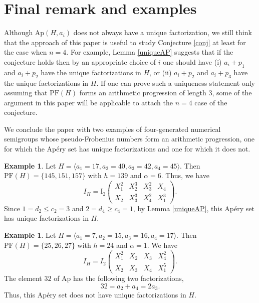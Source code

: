 \documentclass[12pt]{amsart}
\numberwithin{equation}{section}
\theoremstyle{definition}
\newtheorem{example}[theorem]{Example}
\newcommand{\PF}{\mathrm{PF}}
\newcommand{\Ap}{\mathrm{Ap}}
\begin{document}
\section*{Final remark and examples}
Although $\Ap(H,a_i)$ does not always have a unique factorization,
we still think that the approach of this paper is useful to study Conjecture \ref{conj} at least for the case when $n=4$.
For example, Lemma \ref{uniqueAP} suggests that if the conjecture holds then by an appropriate choice of $i$ one should have (i) $a_i+p_1$ and $a_i+p_2$ have the unique factorizations in $H$,
or (ii) $a_i+p_2$ and $a_i+p_3$ have the unique factorizations in $H$. If one can prove such a uniqueness statement only assuming that $\PF(H)$ forms an arithmetic progression of length $3$,
some of the argument in this paper will be applicable to attach the $n=4$ case of the conjecture.

We conclude the paper with two examples of four-generated numerical semigroups whose pseudo-Frobenius numbers form an arithmetic progression, one for which the Apéry set has unique factorizations and one for which it does not.

\begin{example}
    Let $H=\langle a_1=17,a_2=40,a_3=42,a_4=45\rangle$.
    Then
    $\PF(H)=\{145,151,157\}$
    with $h=139$ and $\alpha=6$.
    Thus, we have
    \begin{equation*}
        I_H=\mathrm{I}_2\left(\begin{matrix}
    X_1^2&X_2^3&X_3^2&X_4\\
    X_2&X_3^3&X_4^2&X_1^3
    \end{matrix}\right).
    \end{equation*}
    Since $1=d_2\leq c_2=3$ and $2=d_4 \geq c_4=1$, by Lemma \ref{uniqueAP}, this Ap\'ery set has unique factorizations in $H$.
\end{example}

\begin{example}
    Let $H=\langle a_1=7,a_2=15,a_3=16,a_4=17\rangle$.
    Then
    $\PF(H)=\{25,26,27\}$
    with $h=24$ and $\alpha=1$.
    We have
    \begin{equation*}
        I_H=I_2\left(\begin{matrix}
    X_1^2&X_2&X_3&X_4^2\\
    X_2&X_3&X_4&X_1^5
    \end{matrix}\right).
    \end{equation*}
    The element $32$ of $\Ap$ has the following two factorizations,
    \begin{equation*}
        32 = a_2+a_4 = 2a_3.
    \end{equation*}
    Thus, this Ap\'ery set does not have unique factorizations in $H$.    
\end{example}
\end{document}
